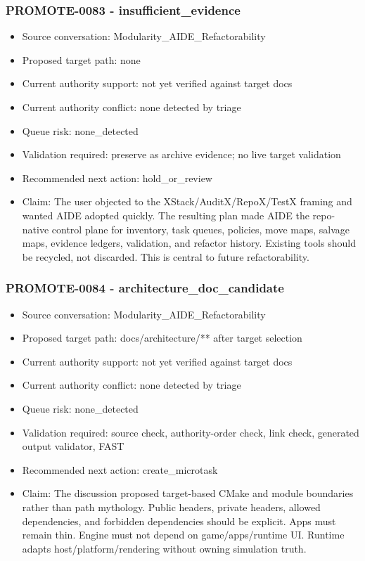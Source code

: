 \documentclass[11pt,a4paper]{report}
\begin{document}
\subsubsection{PROMOTE-0083 - insufficient\_evidence}

\begin{itemize}
\item Source conversation: Modularity\_AIDE\_Refactorability
\item Proposed target path: none
\item Current authority support: not yet verified against target docs
\item Current authority conflict: none detected by triage
\item Queue risk: none\_detected
\item Validation required: preserve as archive evidence; no live target validation
\item Recommended next action: hold\_or\_review
\item Claim: The user objected to the XStack/AuditX/RepoX/TestX framing and wanted AIDE adopted quickly. The resulting plan made AIDE the repo-native control plane for inventory, task queues, policies, move maps, salvage maps, evidence ledgers, validation, and refactor history. Existing tools should be recycled, not discarded. This is central to future refactorability.
\end{itemize}

\subsubsection{PROMOTE-0084 - architecture\_doc\_candidate}

\begin{itemize}
\item Source conversation: Modularity\_AIDE\_Refactorability
\item Proposed target path: docs/architecture/** after target selection
\item Current authority support: not yet verified against target docs
\item Current authority conflict: none detected by triage
\item Queue risk: none\_detected
\item Validation required: source check, authority-order check, link check, generated output validator, FAST
\item Recommended next action: create\_microtask
\item Claim: The discussion proposed target-based CMake and module boundaries rather than path mythology. Public headers, private headers, allowed dependencies, and forbidden dependencies should be explicit. Apps must remain thin. Engine must not depend on game/apps/runtime UI. Runtime adapts host/platform/rendering without owning simulation truth.
\end{itemize}
\end{document}
